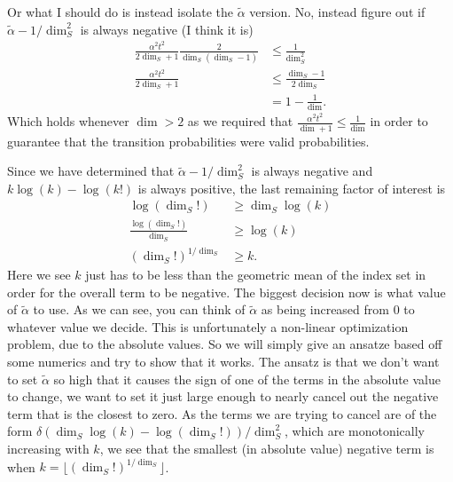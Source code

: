 \documentclass{article}
\begin{document}
Or what I should do is instead isolate the $\widetilde{\alpha}$ version. No, instead figure out if $\widetilde{\alpha} - 1 / \dim_S^2$ is always negative (I think it is)
\begin{align}
    \frac{\alpha^2 t^2}{2 \dim_S + 1} \frac{2}{\dim_S(\dim_S -1)} &\leq \frac{1}{\dim_S^2} \\
    \frac{\alpha^2 t^2}{2 \dim_S + 1} &\leq \frac{\dim_S - 1}{2 \dim_S} \\
    &= 1 - \frac{1}{\dim}.
\end{align}
Which holds whenever $\dim > 2$ as we required that $\frac{\alpha^2 t^2}{\dim + 1} \leq \frac{1}{\dim}$ in order to guarantee that the transition probabilities were valid probabilities. 

Since we have determined that $\widetilde{\alpha} - 1/\dim_S^2$ is always negative and $k\log(k) - \log(k!)$ is always positive, the last remaining factor of interest is
\begin{align}
    \log(\dim_S!) &\geq \dim_S \log(k) \\
    \frac{\log(\dim_S!)}{\dim_S} &\geq \log(k) \\
    (\dim_S!)^{1/\dim_S} &\geq k.
\end{align}
Here we see $k$ just has to be less than the geometric mean of the index set in order for the overall term to be negative. The biggest decision now is what value of $\widetilde{\alpha}$ to use. As we can see, you can think of $\widetilde{\alpha}$ as being increased from 0 to whatever value we decide. This is unfortunately a non-linear optimization problem, due to the absolute values. So we will simply give an ansatze based off some numerics and try to show that it works. The ansatz is that we don't want to set $\widetilde{\alpha}$ so high that it causes the sign of one of the terms in the absolute value to change, we want to set it just large enough to nearly cancel out the negative term that is the closest to zero. As the terms we are trying to cancel are of the form $\delta (\dim_S \log(k) - \log(\dim_S!))/\dim_S^2$, which are monotonically increasing with $k$, we see that the smallest (in absolute value) negative term is when $k = \lfloor (\dim_S!)^{1/\dim_S} \rfloor$.
\end{document}
